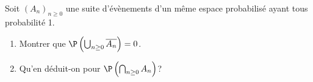 \documentclass[a4paper,10pt]{report}
\begin{document}
\begin{Exa} Soit $(A_n)_{n \geq 0}$ une suite d'évènements d'un même espace probabilisé ayant tous probabilité 1. 
 
 \begin{enumerate}
 \item Montrer que $\P \left( \bigcup_{n \geq 0} \overline{A_n} \right) = 0$.
 \item Qu'en déduit-on pour $\P \left( \bigcap_{n \geq 0} A_n \right)$?
 \end{enumerate}
 \end{Exa}
 
\end{document}
